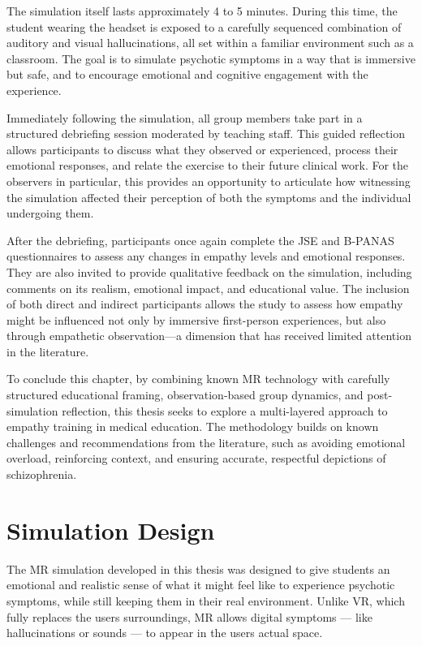 The simulation itself lasts approximately 4 to 5 minutes. During this time, the student wearing the headset is exposed to a carefully sequenced combination of auditory and visual hallucinations, all set within a familiar environment such as a classroom. The goal is to simulate psychotic symptoms in a way that is immersive but safe, and to encourage emotional and cognitive engagement with the experience.

Immediately following the simulation, all group members take part in a structured debriefing session moderated by teaching staff. This guided reflection allows participants to discuss what they observed or experienced, process their emotional responses, and relate the exercise to their future clinical work. For the observers in particular, this provides an opportunity to articulate how witnessing the simulation affected their perception of both the symptoms and the individual undergoing them.

After the debriefing, participants once again complete the JSE and B-PANAS questionnaires to assess any changes in empathy levels and emotional responses. They are also invited to provide qualitative feedback on the simulation, including comments on its realism, emotional impact, and educational value. The inclusion of both direct and indirect participants allows the study to assess how empathy might be influenced not only by immersive first-person experiences, but also through empathetic observation—a dimension that has received limited attention in the literature.

To conclude this chapter, by combining known MR technology with carefully structured educational framing, observation-based group dynamics, and post-simulation reflection, this thesis seeks to explore a multi-layered approach to empathy training in medical education. The methodology builds on known challenges and recommendations from the literature, such as avoiding emotional overload, reinforcing context, and ensuring accurate, respectful depictions of schizophrenia. 

\section{Simulation Design}

The MR simulation developed in this thesis was designed to give students an emotional and realistic sense of what it might feel like to experience psychotic symptoms, while still keeping them in their real environment. Unlike VR, which fully replaces the users surroundings, MR allows digital symptoms — like hallucinations or sounds — to appear in the users actual space. %

